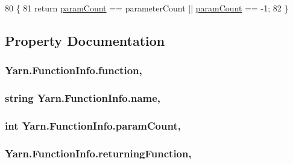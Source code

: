 \begin{DoxyCode}
80         \{
81             \textcolor{keywordflow}{return} \hyperlink{a00084_aa8527de9e4f153b05164ccaf167c3186}{paramCount} == parameterCount || \hyperlink{a00084_aa8527de9e4f153b05164ccaf167c3186}{paramCount} == -1;
82         \}
\end{DoxyCode}


\subsection{Property Documentation}
\hypertarget{a00084_a1dd2f9d11614a2fce170b3f3eecdb5f9}{
\subsubsection[{function}]{ Yarn.\-Function\-Info.\-function\hspace{0.3cm}{\ttfamily [get]}, {\ttfamily [set]}}}\label{a00084_a1dd2f9d11614a2fce170b3f3eecdb5f9}
\hypertarget{a00084_adb38e83e3c1597b553aeff14bef5bfcb}{
\subsubsection[{name}]{\setlength{\rightskip}{0pt plus 5cm}string Yarn.\-Function\-Info.\-name\hspace{0.3cm}{\ttfamily [get]}, {\ttfamily [set]}}}\label{a00084_adb38e83e3c1597b553aeff14bef5bfcb}
\hypertarget{a00084_aa8527de9e4f153b05164ccaf167c3186}{
\subsubsection[{param\-Count}]{\setlength{\rightskip}{0pt plus 5cm}int Yarn.\-Function\-Info.\-param\-Count\hspace{0.3cm}{\ttfamily [get]}, {\ttfamily [set]}}}\label{a00084_aa8527de9e4f153b05164ccaf167c3186}
\hypertarget{a00084_a8b6e0e5a875c427a1d947f3c52c308ca}{
\subsubsection[{returning\-Function}]{ Yarn.\-Function\-Info.\-returning\-Function\hspace{0.3cm}{\ttfamily [get]}, {\ttfamily [set]}}}\label{a00084_a8b6e0e5a875c427a1d947f3c52c308ca}
